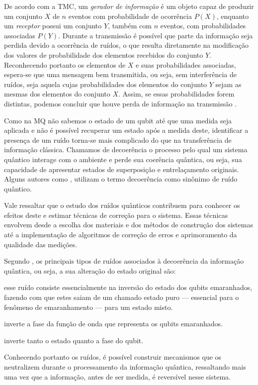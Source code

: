 De acordo com  a TMC, um \textit{gerador de informação} é um objeto capaz de produzir um conjunto $X$ de $n$ eventos com probabilidade de ocorrência $P(X)$, enquanto um \textit{receptor} possui um conjunto $Y$, também com $n$ eventos, com probabilidades associadas $P(Y)$. Durante a transmissão é possível que parte da informação seja perdida devido a ocorrência de ruídos, o que resulta diretamente na modificação dos valores de probabilidade dos elementos recebidos do conjunto $Y$. Reconhecendo portanto os elementos de $X$ e suas probabilidades associadas, espera-se que uma mensagem bem transmitida, ou seja, sem interferência de ruídos, seja aquela cujas probabilidades dos elementos do conjunto $Y$ sejam as mesmas dos elementos do conjunto $X$. Assim, se essas probabilidades forem distintas, podemos concluir que houve perda de informação na transmissão \cite{mathematical}.

Como na MQ não sabemos o estado de um qubit até que uma medida seja aplicada e não é possível recuperar um estado após a medida deste, identificar a presença de um ruído torna-se mais complicado do que na transferência de informação clássica. Chamamos de decoerência o processo pelo qual um sistema quântico interage com o ambiente e perde sua coerência quântica, ou seja, sua capacidade de apresentar estados de superposição e entrelaçamento originais. Alguns autores como \textcite{chuang}, utilizam o termo decoerência como sinônimo de ruído quântico.

Vale ressaltar que o estudo dos ruídos quânticos contribuem para conhecer os efeitos deste e estimar técnicas de correção para o sistema. Essas técnicas envolvem desde a escolha dos materiais e dos métodos de construção dos sistemas até a implementação de algoritmos de correção de erros e aprimoramento da qualidade das medições.

Segundo \textcite{teseufscar}, os principais tipos de ruídos associados à decoerência da informação quântica, ou seja, a sua alteração do estado original são:

\begin{description}\label{tiposruidos}
  \item [Inversão de bit (\textit{bitflip})] esse ruído consiste essencialmente na inversão do estado dos qubits emaranhados, fazendo com que estes saiam de um chamado estado puro --- essencial para o fenômeno de emaranhamento --- para um estado misto.
  \item [Inversão de fase (\textit{phaseflip})] inverte a fase da função de onda que representa os qubits emaranhados.
  \item [Inversão de bit e fase (\textit{bit-phase flip})] inverte tanto o estado quanto a fase do qubit.
\end{description}

Conhecendo portanto os ruídos, é possível construir mecanismos que os neutralizem durante o processamento da informação quântica, ressaltando mais uma vez que a informação, antes de ser medida, é reversível nesse sistema.

